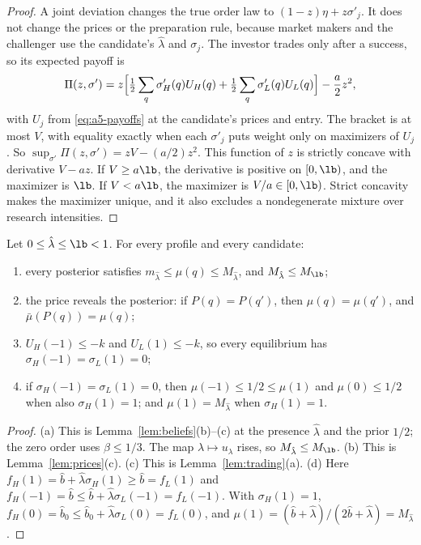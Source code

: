\begin{proof}
A joint deviation changes the true order law to \((1-z)\eta+z\sigma'_j\). It does not change the prices or the
preparation rule, because market makers and the challenger use the candidate's \(\hat\lambda\) and \(\sigma_j\).
The investor trades only after a success, so its expected payoff is
\[
\Pi(z,\sigma')=z\Bigl[\tfrac12\sum_q\sigma'_H(q)U_H(q)+\tfrac12\sum_q\sigma'_L(q)U_L(q)\Bigr]-\frac a2z^2 ,
\]
with \(U_j\) from \eqref{eq:a5-payoffs} at the candidate's prices and entry. The bracket is at most \(V\), with
equality exactly when each \(\sigma'_j\) puts weight only on maximizers of \(U_j\). So
\(\sup_{\sigma'}\Pi(z,\sigma')=zV-(a/2)z^2\). This function of \(z\) is strictly concave with derivative \(V-az\). If
\(V\ge a\lb\), the derivative is positive on \([0,\lb)\), and the maximizer is \(\lb\). If \(V<a\lb\), the
maximizer is \(V/a\in[0,\lb)\). Strict concavity makes the maximizer unique, and it also excludes a nondegenerate
mixture over research intensities.
\end{proof}

\begin{lemma}\label{lem:a5-bounds}
Let \(0\le\hat\lambda\le\lb<1\). For every profile and every candidate:
\begin{enumerate}[label=(\alph*),leftmargin=2em]
\item every posterior satisfies \(m_{\hat\lambda}\le\mu(q)\le M_{\hat\lambda}\), and \(M_{\hat\lambda}\le M_{\lb}\);
\item the price reveals the posterior: if \(P(q)=P(q')\), then \(\mu(q)=\mu(q')\), and \(\bar\mu(P(q))=\mu(q)\);
\item \(U_H(-1)\le-k\) and \(U_L(1)\le-k\), so every equilibrium has \(\sigma_H(-1)=\sigma_L(1)=0\);
\item if \(\sigma_H(-1)=\sigma_L(1)=0\), then \(\mu(-1)\le1/2\le\mu(1)\) and \(\mu(0)\le1/2\) when also
\(\sigma_H(1)=1\); and \(\mu(1)=M_{\hat\lambda}\) when \(\sigma_H(1)=1\).
\end{enumerate}
\end{lemma}

\begin{proof}
(a) This is Lemma~\ref{lem:beliefs}(b)--(c) at the presence \(\hat\lambda\) and the prior \(1/2\); the zero order
uses \(\beta\le1/3\). The map \(\lambda\mapsto u_\lambda\) rises, so \(M_{\hat\lambda}\le M_{\lb}\). (b) This is
Lemma~\ref{lem:prices}(c). (c) This is Lemma~\ref{lem:trading}(a). (d) Here \(f_H(1)=\hat b+\hat\lambda\sigma_H(1)\ge
\hat b=f_L(1)\) and \(f_H(-1)=\hat b\le\hat b+\hat\lambda\sigma_L(-1)=f_L(-1)\). With \(\sigma_H(1)=1\),
\(f_H(0)=\hat b_0\le\hat b_0+\hat\lambda\sigma_L(0)=f_L(0)\), and
\(\mu(1)=(\hat b+\hat\lambda)/(2\hat b+\hat\lambda)=M_{\hat\lambda}\).
\end{proof}

